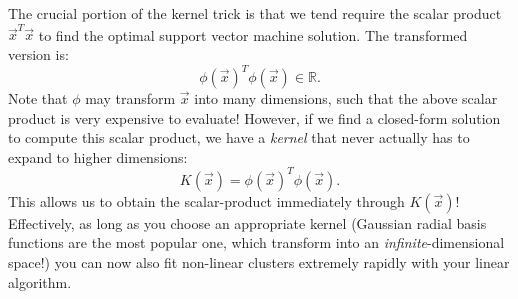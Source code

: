 \documentclass{article}
\begin{document}
\vspace{-0.3cm}
{\flushleft The} crucial portion of the kernel trick is that we tend require the scalar product $\vec{x}^T\vec{x}$ to find the optimal support vector machine solution. The transformed version is:
\begin{equation}
    \phi(\vec{x})^T\phi(\vec{x}) \in \mathbb{R}.
\end{equation}
Note that $\phi$ may transform $\vec{x}$ into many dimensions, such that the above scalar product is very expensive to evaluate! However, if we find a closed-form solution to compute this scalar product, we have a \textit{kernel} that never actually has to expand to higher dimensions:
\begin{equation}
    K(\vec{x}) = \phi(\vec{x})^T\phi(\vec{x}).
\end{equation}
This allows us to obtain the scalar-product immediately through $K(\vec{x})$! Effectively, as long as you choose an appropriate kernel (Gaussian radial basis functions are the most popular one, which transform into an \textit{infinite}-dimensional space!) you can now also fit non-linear clusters extremely rapidly with your linear algorithm.

\newpage
\end{document}
